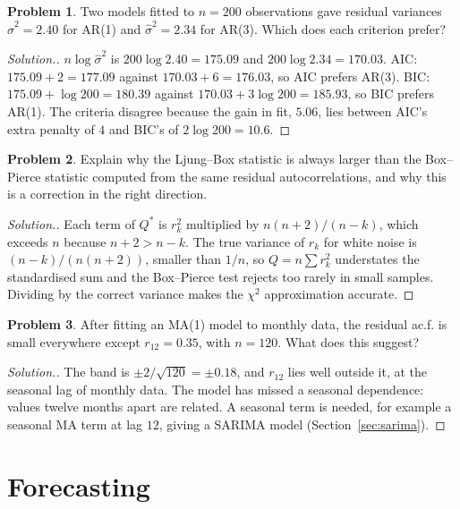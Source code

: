 \documentclass[11pt,a4paper]{article}
\theoremstyle{definition}
\newtheorem{problemx}{Problem}[subsection]
\newenvironment{problem}{\begin{problemx}}{\end{problemx}}
\newenvironment{solution}
  {\renewcommand{\qedsymbol}{}\begin{proof}[\textit{Solution}.]}
  {\end{proof}}
\begin{document}
\begin{problem}\label{prob:aic-choice}
Two models fitted to $n = 200$ observations gave residual variances $\hat\sigma^2 = 2.40$ for AR(1) and $\hat\sigma^2 = 2.34$ for AR(3). Which does
each criterion prefer?
\end{problem}

\begin{solution}
$n\log\hat\sigma^2$ is $200\log2.40 = 175.09$ and $200\log2.34 = 170.03$. AIC: $175.09 + 2 = 177.09$ against $170.03 + 6 = 176.03$, so AIC prefers AR(3). BIC:
$175.09 + \log200 = 180.39$ against $170.03 + 3\log200 = 185.93$, so BIC prefers AR(1). The criteria disagree because the gain in fit,
$5.06$, lies between AIC's extra penalty of $4$ and BIC's of $2\log200 = 10.6$.
\end{solution}

\begin{problem}\label{prob:ljung-small}
Explain why the Ljung--Box statistic is always larger than the Box--Pierce statistic computed from the same
residual autocorrelations, and why this is a correction in the right direction.
\end{problem}

\begin{solution}
Each term of $Q^*$ is $r_k^2$ multiplied by $n(n + 2)/(n - k)$, which exceeds $n$ because $n + 2 > n - k$. The true variance of $r_k$ for white noise is
$(n - k)/(n(n + 2))$, smaller than $1/n$, so $Q = n\sum r_k^2$ understates the standardised sum and the Box--Pierce test rejects too
rarely in small samples. Dividing by the correct variance makes the $\chi^2$ approximation accurate.
\end{solution}

\begin{problem}\label{prob:resid-pattern}
After fitting an MA(1) model to monthly data, the residual ac.f. is small everywhere except $r_{12} = 0.35$, with $n = 120$. What
does this suggest?
\end{problem}

\begin{solution}
The band is $\pm2/\sqrt{120} = \pm0.18$, and $r_{12}$ lies well outside it, at the seasonal lag of monthly data. The model has missed a
seasonal dependence: values twelve months apart are related. A seasonal term is needed, for example a
seasonal MA term at lag $12$, giving a SARIMA model (Section~\ref{sec:sarima}).
\end{solution}

\section{Forecasting}\label{sec:forecasting}
\end{document}
